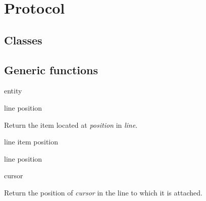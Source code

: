 \appendix

\section{Protocol}

\subsection{Classes}




\subsection{Generic functions}

 {entity}

 {line position}

Return the item located at \textit{position} in \textit{line}.

 {line item position}

 {line position}

 {cursor}

Return the position of \textit{cursor} in the line to which it is
attached.
